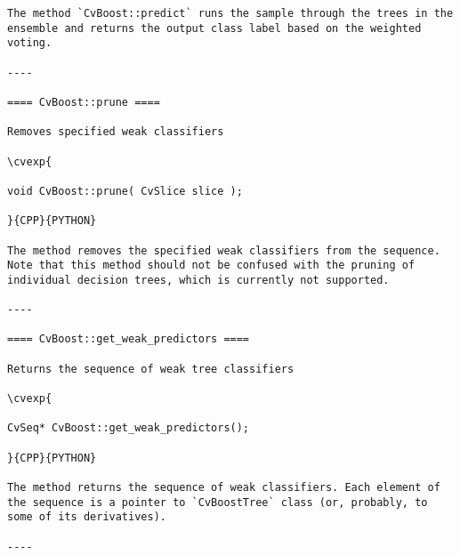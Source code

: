 \begin{verbatim}
The method `CvBoost::predict` runs the sample through the trees in the ensemble and returns the output class label based on the weighted voting.

----

==== CvBoost::prune ====

Removes specified weak classifiers

\cvexp{

void CvBoost::prune( CvSlice slice );

}{CPP}{PYTHON}

The method removes the specified weak classifiers from the sequence. Note that this method should not be confused with the pruning of individual decision trees, which is currently not supported.

----

==== CvBoost::get_weak_predictors ====

Returns the sequence of weak tree classifiers

\cvexp{

CvSeq* CvBoost::get_weak_predictors();

}{CPP}{PYTHON}

The method returns the sequence of weak classifiers. Each element of the sequence is a pointer to `CvBoostTree` class (or, probably, to some of its derivatives).

----

\end{verbatim}
